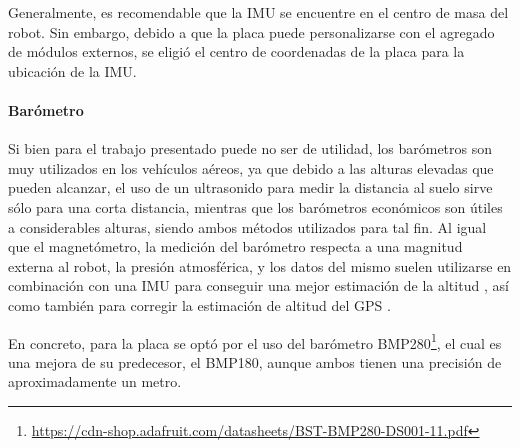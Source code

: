 Generalmente, es recomendable que la IMU se encuentre en el centro de masa del robot. Sin embargo, debido a que la placa puede personalizarse con el agregado de módulos externos, se eligió el centro de coordenadas de la placa para la ubicación de la IMU.

\paragraph{Barómetro}
Si bien para el trabajo presentado puede no ser de utilidad, los barómetros son muy utilizados en los vehículos aéreos, ya que debido a las alturas elevadas que pueden alcanzar, el uso de un ultrasonido para medir la distancia al suelo sirve sólo para una corta distancia, mientras que los barómetros económicos son útiles a considerables alturas, siendo ambos métodos utilizados para tal fin. Al igual que el magnetómetro, la medición del barómetro respecta a una magnitud externa al robot, la presión atmosférica, y los datos del mismo suelen utilizarse en combinación con una IMU para conseguir una mejor estimación de la altitud \cite{tanigawa2008}, así como también para corregir la estimación de altitud del GPS \cite{zaliva2014}.

En concreto, para la placa se optó por el uso del barómetro BMP280\footnote{\url{https://cdn-shop.adafruit.com/datasheets/BST-BMP280-DS001-11.pdf}}, el cual es una mejora de su predecesor, el BMP180, aunque ambos tienen una precisión de aproximadamente un metro.

